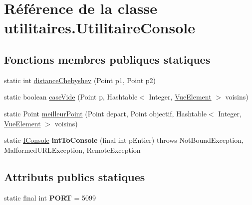 \hypertarget{classutilitaires_1_1_utilitaire_console}{\section{Référence de la classe utilitaires.\-Utilitaire\-Console}
\label{classutilitaires_1_1_utilitaire_console}
}
\subsection*{Fonctions membres publiques statiques}
\begin{DoxyCompactItemize}
\item 
static int \hyperlink{classutilitaires_1_1_utilitaire_console_a8f1e1132caa9d8c8053928059a4d135f}{distance\-Chebyshev} (Point p1, Point p2)
\item 
static boolean \hyperlink{classutilitaires_1_1_utilitaire_console_a0a8a70d43c8e2b088c61bd54426aa54e}{case\-Vide} (Point p, Hashtable$<$ Integer, \hyperlink{classinterface_graphique_1_1_vue_element}{Vue\-Element} $>$ voisins)
\item 
static Point \hyperlink{classutilitaires_1_1_utilitaire_console_a908f412de528ec70fd53ae469b854937}{meilleur\-Point} (Point depart, Point objectif, Hashtable$<$ Integer, \hyperlink{classinterface_graphique_1_1_vue_element}{Vue\-Element} $>$ voisins)
\item 
\hypertarget{classutilitaires_1_1_utilitaire_console_afefbddbddd17cb5181ec36d022143391}{static \hyperlink{interfacecontrole_1_1_i_console}{I\-Console} {\bfseries int\-To\-Console} (final int p\-Entier)  throws Not\-Bound\-Exception, Malformed\-U\-R\-L\-Exception, Remote\-Exception }\label{classutilitaires_1_1_utilitaire_console_afefbddbddd17cb5181ec36d022143391}

\end{DoxyCompactItemize}
\subsection*{Attributs publics statiques}
\begin{DoxyCompactItemize}
\item 
\hypertarget{classutilitaires_1_1_utilitaire_console_a664f512c04d1df24958a9b7c50a3be3e}{static final int {\bfseries P\-O\-R\-T} = 5099}\label{classutilitaires_1_1_utilitaire_console_a664f512c04d1df24958a9b7c50a3be3e}

\end{DoxyCompactItemize}


